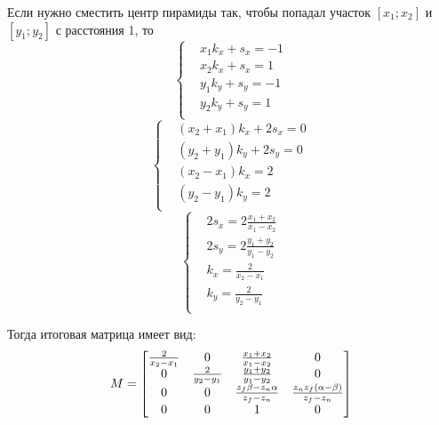 Если нужно сместить центр пирамиды так,
чтобы попадал участок $[x_1; x_2]$ и $[y_1; y_2]$
с расстояния 1, то
\[
    \left\{
    \begin{aligned}
        & x_1 k_x + s_x = -1 \\
        & x_2 k_x + s_x = 1 \\
        & y_1 k_y + s_y = -1 \\
        & y_2 k_y + s_y = 1 \\
    \end{aligned}
    \right.
\]
\[
    \left\{
    \begin{aligned}
        & (x_2 + x_1) k_x + 2 s_x = 0 \\
        & (y_2 + y_1) k_y + 2 s_y = 0 \\
        & (x_2 - x_1) k_x = 2 \\
        & (y_2 - y_1) k_y = 2 \\
    \end{aligned}
    \right.
\]
\[
    \left\{
    \begin{aligned}
        & 2 s_x = 2 \frac{x_1 + x_2}{x_1 - x_2} \\
        & 2 s_y = 2 \frac{y_1 + y_2}{y_1 - y_2} \\
        & k_x = \frac{2}{x_2 - x_1} \\
        & k_y = \frac{2}{y_2 - y_1} \\
    \end{aligned}
    \right.
\]

Тогда итоговая матрица имеет вид:
\[
    M =
    \begin{bmatrix}
        \frac{2}{x_2 - x_1} & 0 & \frac{x_1 + x_2}{x_1 - x_2} & 0 \\
        0 & \frac{2}{y_2 - y_1} & \frac{y_1 + y_2}{y_1 - y_2} & 0 \\
        0 & 0 & \frac{z_f \beta - z_n \alpha}{z_f - z_n} & \frac{z_n z_f (\alpha - \beta)}{z_f - z_n} \\
        0 & 0 & 1 & 0 \\
    \end{bmatrix}
\]
